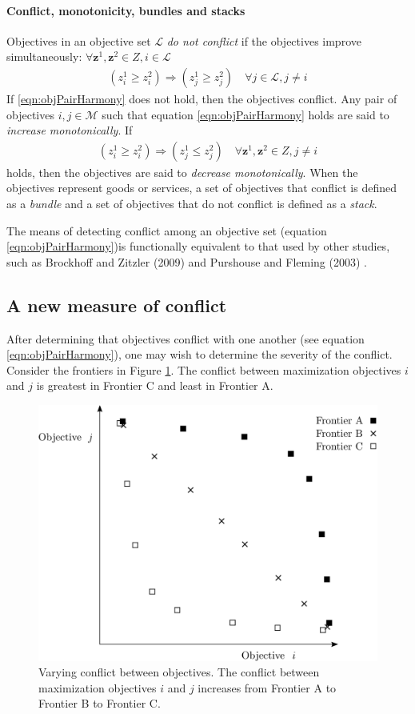 \paragraph{Conflict, monotonicity, bundles and stacks}
Objectives in an objective set $\mathcal{L}$ \textit{do not conflict} if the objectives improve simultaneously:
$\forall \mathbf{z}^1, \mathbf{z}^2 \in Z, i \in \mathcal{L}$
\begin{align}
(z^1_i \ge z^2_i) \Rightarrow (z^1_j \ge z^2_j) \quad \forall j \in \mathcal{L}, j \neq i \label{eqn:objPairHarmony}
\end{align}
If \eqref{eqn:objPairHarmony} does not hold, then the objectives conflict. Any pair of objectives $i,j \in \mathcal{M}$ such that equation \eqref{eqn:objPairHarmony} holds are said to \textit{increase monotonically}. If 
\begin{align}
(z^1_i \ge z^2_i) \Rightarrow (z^1_j \le z^2_j) \quad \forall \mathbf{z}^1, \mathbf{z}^2 \in Z, j \neq i \label{eqn:objPairMonoDec}
\end{align}
holds, then the objectives are said to \textit{decrease monotonically}. When the objectives represent goods or services, a set of objectives that conflict is defined as a \textit{bundle} and a set of objectives that do not conflict is defined as a \textit{stack}.

The means of detecting conflict among an objective set (equation \eqref{eqn:objPairHarmony})is functionally equivalent to that used by other studies, such as Brockhoff and Zitzler (2009) \cite{brockhoff2009objective} and Purshouse and Fleming (2003) \cite{purshouse2003conflict}.

\subsection{A new measure of conflict}
After determining that objectives conflict with one another (see equation \eqref{eqn:objPairHarmony}), one may wish to determine the severity of the conflict. Consider the frontiers in Figure \ref{fig:ConflictVariesExample}. The conflict between maximization objectives $i$ and $j$ is greatest in Frontier C and least in Frontier A.
\begin{figure}[ht]
\centering
\includegraphics[width=.6\textwidth]{../images/ConflictVariesExample}
\caption[Example of varying conflict between objectives]{Varying conflict between objectives. The conflict between maximization objectives $i$ and $j$ increases from Frontier A to Frontier B to Frontier C.}
\label{fig:ConflictVariesExample}
\end{figure}

